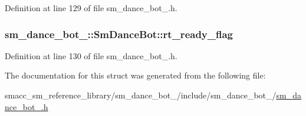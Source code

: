 Definition at line 129 of file sm\+\_\+dance\+\_\+bot\+\_.\+h.

\subsubsection[{\texorpdfstring{rt\+\_\+ready\+\_\+flag}{rt_ready_flag}}]{ sm\+\_\+dance\+\_\+bot\+\_\+::\+Sm\+Dance\+Bot\+::rt\+\_\+ready\+\_\+flag}\hypertarget{structsm__dance__bot__3_1_1SmDanceBot_a3f8e3b6a1b7cb4984e9fe281d84a2ab2}{}\label{structsm__dance__bot__3_1_1SmDanceBot_a3f8e3b6a1b7cb4984e9fe281d84a2ab2}


Definition at line 130 of file sm\+\_\+dance\+\_\+bot\+\_.\+h.



The documentation for this struct was generated from the following file\+:\begin{DoxyCompactItemize}
\item 
smacc\+\_\+sm\+\_\+reference\+\_\+library/sm\+\_\+dance\+\_\+bot\+\_/include/sm\+\_\+dance\+\_\+bot\+\_/\hyperlink{sm__dance__bot__3_8h}{sm\+\_\+dance\+\_\+bot\+\_.\+h}\end{DoxyCompactItemize}
